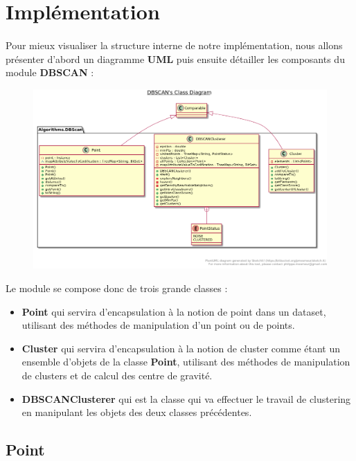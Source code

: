 		
		
	\section{Implémentation}
		\paragraph{}
		Pour mieux visualiser la structure interne de notre implémentation, nous allons présenter d'abord un diagramme \textbf{UML} puis ensuite détailler les composants du module \textbf{DBSCAN} : 
		\begin{figure}[H]
			\centering
			\includegraphics[width=\linewidth]{dbscan/images/uml.png}
		\end{figure}
		\par 
		Le module se compose donc de trois grande classes : 
		\begin{itemize}
			\item \textbf{Point} qui servira d'encapsulation à la notion de point dans un dataset, utilisant des méthodes de manipulation d'un point ou de points.
			\item \textbf{Cluster} qui servira d'encapsulation à la notion de cluster comme étant un ensemble d'objets de la classe \textbf{Point}, utilisant des méthodes de manipulation de clusters et de calcul des centre de gravité.
			\item \textbf{DBSCANClusterer} qui est la classe qui va effectuer le travail de clustering en manipulant les objets des deux classes précédentes.
		\end{itemize}
	
	\subsection*{Point}
